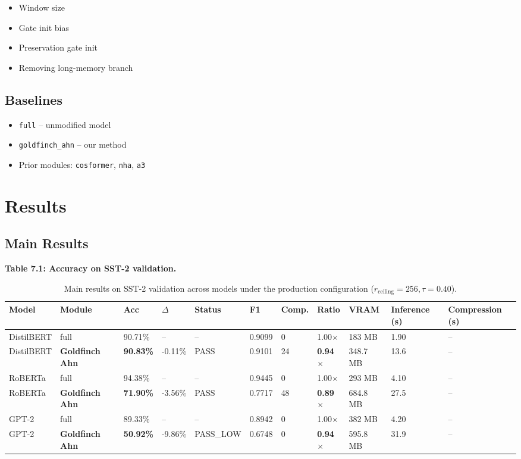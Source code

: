 \begin{itemize}
\item Window size
\item Gate init bias
\item Preservation gate init
\item Removing long-memory branch

\end{itemize}
\subsection{Baselines}

\begin{itemize}
\item \texttt{full} -- unmodified model
\item \texttt{goldfinch\_ahn} -- our method
\item Prior modules: \texttt{cosformer}, \texttt{nha}, \texttt{a3}

\end{itemize}



\section{Results}

\subsection{Main Results}

\textbf{Table 7.1: Accuracy on SST-2 validation.}

\begin{table}[t]
\centering
\small
\begin{tabular}{lllllllllll}
\toprule
\textbf{Model} & \textbf{Module} & \textbf{Acc} & \textbf{$\Delta$} & \textbf{Status} & \textbf{F1} & \textbf{Comp.} & \textbf{Ratio} & \textbf{VRAM} & \textbf{Inference (s)} & \textbf{Compression (s)} \\
\midrule
DistilBERT & full & 90.71\% & -- & -- & 0.9099 & 0 & 1.00$\times$ & 183 MB & 1.90 & -- \\
DistilBERT & \textbf{Goldfinch Ahn} & \textbf{90.83\%} & -0.11\% & PASS & 0.9101 & 24 & \textbf{0.94$\times$} & 348.7 MB & 13.6 & -- \\
RoBERTa & full & 94.38\% & -- & -- & 0.9445 & 0 & 1.00$\times$ & 293 MB & 4.10 & -- \\
RoBERTa & \textbf{Goldfinch Ahn} & \textbf{71.90\%} & -3.56\% & PASS & 0.7717 & 48 & \textbf{0.89$\times$} & 684.8 MB & 27.5 & -- \\
GPT-2 & full & 89.33\% & -- & -- & 0.8942 & 0 & 1.00$\times$ & 382 MB & 4.20 & -- \\
GPT-2 & \textbf{Goldfinch Ahn} & \textbf{50.92\%} & -9.86\% & PASS_LOW & 0.6748 & 0 & \textbf{0.94$\times$} & 595.8 MB & 31.9 & -- \\
\bottomrule
\end{tabular}
\caption{Main results on SST-2 validation across models under the production configuration ($r_{\mathrm{ceiling}}=256, \tau=0.40$).}
\label{tab:main_sst2}
\end{table}

